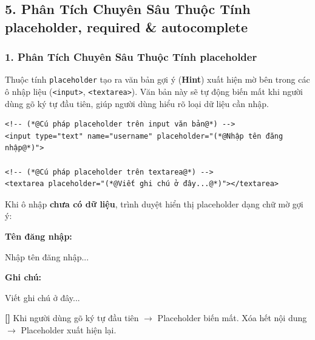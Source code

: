 \documentclass[11pt,oneside]{book}
\newcommand{\codeinline}[1]{\textcolor{accentOrange}{\texttt{#1}}}
\newcommand{\term}[1]{\textbf{\textcolor{primaryBlue}{#1}}}
\begin{document}
\subsection{5. Phân Tích Chuyên Sâu Thuộc Tính placeholder, required \& autocomplete}

\subsubsection{1. Phân Tích Chuyên Sâu Thuộc Tính placeholder}

\begin{conceptBox}
Thuộc tính \codeinline{placeholder} tạo ra văn bản gợi ý (\term{Hint}) xuất hiện mờ bên trong các ô nhập liệu (\codeinline{<input>}, \codeinline{<textarea>}). Văn bản này sẽ tự động biến mất khi người dùng gõ ký tự đầu tiên, giúp người dùng hiểu rõ loại dữ liệu cần nhập.
\end{conceptBox}

\begin{codeWindow}
\begin{lstlisting}[language=HTML5]
<!-- (*@Cú pháp placeholder trên input văn bản@*) -->
<input type="text" name="username" placeholder="(*@Nhập tên đăng nhập@*)">

<!-- (*@Cú pháp placeholder trên textarea@*) -->
<textarea placeholder="(*@Viết ghi chú ở đây...@*)"></textarea>
\end{lstlisting}
\end{codeWindow}

\begin{browserWindow}
\sffamily\small
Khi ô nhập \textbf{chưa có dữ liệu}, trình duyệt hiển thị placeholder dạng chữ mờ gợi ý:
\begin{tcolorbox}[colback=white, colframe=gray!30, arc=4pt, boxrule=0.8pt, left=10pt, right=10pt, top=8pt, bottom=8pt]
\textbf{\sffamily\small\textcolor{darkText}{Tên đăng nhập:}}\\[3pt]
\begin{tcolorbox}[colback=white, colframe=gray!40, arc=3pt, boxrule=0.6pt, left=8pt, right=8pt, top=4pt, bottom=4pt]
\textcolor{gray!50}{\sffamily\small Nhập tên đăng nhập...}
\end{tcolorbox}
\vspace{4pt}
\textbf{\sffamily\small\textcolor{darkText}{Ghi chú:}}\\[3pt]
\begin{tcolorbox}[colback=white, colframe=gray!40, arc=3pt, boxrule=0.6pt, left=8pt, right=8pt, top=4pt, bottom=12pt]
\textcolor{gray!50}{\sffamily\small Viết ghi chú ở đây...}
\end{tcolorbox}
\end{tcolorbox}
\textcolor{primaryBlue}{\textbf{[\textrightarrow]}} Khi người dùng gõ ký tự đầu tiên $\rightarrow$ Placeholder biến mất. Xóa hết nội dung $\rightarrow$ Placeholder xuất hiện lại.
\end{browserWindow}
\end{document}
